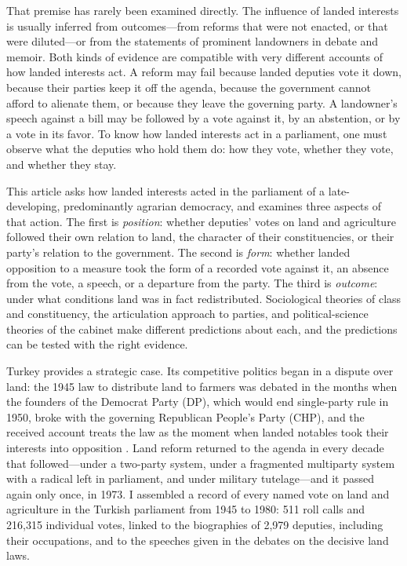 \documentclass[12pt]{article}
\begin{document}
That premise has rarely been examined directly. The influence of landed interests is usually inferred from outcomes---from reforms that were not enacted, or that were diluted---or from the statements of prominent landowners in debate and memoir. Both kinds of evidence are compatible with very different accounts of how landed interests act. A reform may fail because landed deputies vote it down, because their parties keep it off the agenda, because the government cannot afford to alienate them, or because they leave the governing party. A landowner's speech against a bill may be followed by a vote against it, by an abstention, or by a vote in its favor. To know how landed interests act in a parliament, one must observe what the deputies who hold them do: how they vote, whether they vote, and whether they stay.

This article asks how landed interests acted in the parliament of a late-developing, predominantly agrarian democracy, and examines three aspects of that action. The first is \textit{position}: whether deputies' votes on land and agriculture followed their own relation to land, the character of their constituencies, or their party's relation to the government. The second is \textit{form}: whether landed opposition to a measure took the form of a recorded vote against it, an absence from the vote, a speech, or a departure from the party. The third is \textit{outcome}: under what conditions land was in fact redistributed. Sociological theories of class and constituency, the articulation approach to parties, and political-science theories of the cabinet make different predictions about each, and the predictions can be tested with the right evidence.

Turkey provides a strategic case. Its competitive politics began in a dispute over land: the 1945 law to distribute land to farmers was debated in the months when the founders of the Democrat Party (DP), which would end single-party rule in 1950, broke with the governing Republican People's Party (CHP), and the received account treats the law as the moment when landed notables took their interests into opposition \citep{karpat1959,keyderpamuk1984}. Land reform returned to the agenda in every decade that followed---under a two-party system, under a fragmented multiparty system with a radical left in parliament, and under military tutelage---and it passed again only once, in 1973. I assembled a record of every named vote on land and agriculture in the Turkish parliament from 1945 to 1980: 511 roll calls and 216,315 individual votes, linked to the biographies of 2,979 deputies, including their occupations, and to the speeches given in the debates on the decisive land laws.
\end{document}
